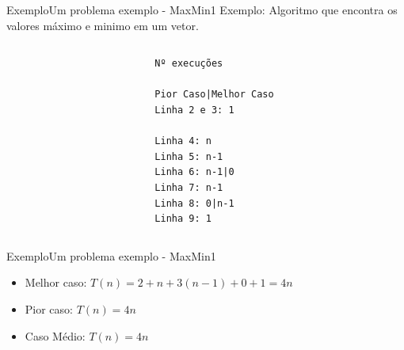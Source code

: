 \documentclass[aspectratio=169]{beamer}
\begin{document}

\begin{frame}[fragile]{Exemplo}{Um problema exemplo - MaxMin1}
Exemplo: Algoritmo que encontra os valores máximo e minimo em um vetor.
\begin{columns}[T] %
\begin{column}{.68\textwidth}
\end{column}%
\hfill%
\begin{column}{.28\textwidth}
\begin{verbatim}
Nº execuções

Pior Caso|Melhor Caso
Linha 2 e 3: 1

Linha 4: n
Linha 5: n-1
Linha 6: n-1|0
Linha 7: n-1
Linha 8: 0|n-1
Linha 9: 1
\end{verbatim}
\end{column}%
\end{columns}
\end{frame}
	

\begin{frame}{Exemplo}{Um problema exemplo - MaxMin1}
\begin{itemize}
\item Melhor caso: $T(n) = 2 + n + 3(n-1) + 0 + 1 = 4n$
\item Pior caso: $T(n) = 4n$
\item Caso Médio: $T(n) = 4n$
\end{itemize}
\end{frame}
\end{document}
